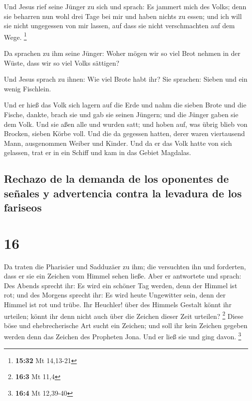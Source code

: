 Und Jesus rief seine Jünger zu sich und sprach: Es
jammert mich des Volks; denn sie beharren nun wohl drei Tage bei mir und
haben nichts zu essen; und ich will sie nicht ungegessen von mir lassen,
auf dass sie nicht verschmachten auf dem Wege. \footnote{\textbf{15:32}
  Mt 14,13-21}

 Da sprachen zu ihm seine Jünger: Woher mögen wir so viel
Brot nehmen in der Wüste, dass wir so viel Volks sättigen?

 Und Jesus sprach zu ihnen: Wie viel Brote habt ihr? Sie
sprachen: Sieben und ein wenig Fischlein.

 Und er hieß das Volk sich lagern auf die Erde
 und nahm die sieben Brote und die Fische, dankte, brach
sie und gab sie seinen Jüngern; und die Jünger gaben sie dem Volk.
 Und sie aßen alle und wurden satt; und hoben auf, was
übrig blieb von Brocken, sieben Körbe voll.  Und die da
gegessen hatten, derer waren viertausend Mann, ausgenommen Weiber und
Kinder.  Und da er das Volk hatte von sich gelassen, trat
er in ein Schiff und kam in das Gebiet Magdalas.

\hypertarget{rechazo-de-la-demanda-de-los-oponentes-de-seuxf1ales-y-advertencia-contra-la-levadura-de-los-fariseos}{%
\subsection{Rechazo de la demanda de los oponentes de señales y
advertencia contra la levadura de los
fariseos}\label{rechazo-de-la-demanda-de-los-oponentes-de-seuxf1ales-y-advertencia-contra-la-levadura-de-los-fariseos}}

\hypertarget{section-15}{%
\section{16}\label{section-15}}

 Da traten die Pharisäer und Sadduzäer zu ihm; die
versuchten ihn und forderten, dass er sie ein Zeichen vom Himmel sehen
ließe.  Aber er antwortete und sprach: Des Abends sprecht
ihr: Es wird ein schöner Tag werden, denn der Himmel ist rot;
 und des Morgens sprecht ihr: Es wird heute Ungewitter
sein, denn der Himmel ist rot und trübe. Ihr Heuchler! über des Himmels
Gestalt könnt ihr urteilen; könnt ihr denn nicht auch über die Zeichen
dieser Zeit urteilen? \footnote{\textbf{16:3} Mt 11,4} 
Diese böse und ehebrecherische Art sucht ein Zeichen; und soll ihr kein
Zeichen gegeben werden denn das Zeichen des Propheten Jona. Und er ließ
sie und ging davon. \footnote{\textbf{16:4} Mt 12,39-40}


